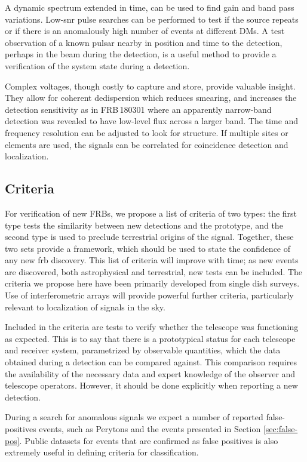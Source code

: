\documentclass[a4paper,fleqn,usenatbib]{mnras}
\begin{document}
A dynamic spectrum extended in time, can be used to find gain and band pass
variations. Low-\gls{snr} pulse searches can be performed to test if the source
repeats or if there is an anomalously high number of events at different DMs.  A
test observation of a known pulsar nearby in position and time to the detection,
perhaps in the beam during the detection, is a useful method to provide a
verification of the system state during a detection.

Complex voltages, though costly to capture and store, provide valuable insight.
They allow for coherent dedispersion which reduces smearing, and increases the
detection sensitivity as in FRB\,180301 \citep{atel11376} where an apparently
narrow-band detection was revealed to have low-level flux across a larger band.
The time and frequency resolution can be adjusted to look for structure. If
multiple sites or elements are used, the signals can be correlated for
coincidence detection and localization.

\subsection{Criteria}
\label{sec:criteria}

For verification of new FRBs, we propose a list of criteria of two types: the
first type tests the similarity between new detections and the prototype, and
the second type is used to preclude terrestrial origins of the signal. Together,
these two sets provide a framework, which should be used to state the confidence
of any new \gls{frb} discovery. This list of criteria will improve with time; as
new events are discovered, both astrophysical and terrestrial, new tests can be
included. The criteria we propose here have been primarily developed from single
dish surveys.  Use of interferometric arrays will provide powerful further
criteria, particularly relevant to localization of signals in the sky.

Included in the criteria are tests to verify whether the telescope was
functioning as expected. This is to say that there is a prototypical status for
each telescope and receiver system, parametrized by observable quantities, which
the data obtained during a detection can be compared against.  This comparison
requires the availability of the necessary data and expert knowledge of the
observer and telescope operators. However, it should be done explicitly when
reporting a new detection.

During a search for anomalous signals we expect a number of reported
false-positives events, such as Perytons \citep{2011ApJ...727...18B} and the
events presented in Section \ref{sec:false-pos}.  Public datasets for events
that are confirmed as false positives is also extremely useful in defining
criteria for classification. 
\end{document}
